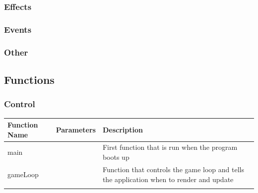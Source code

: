 \documentclass[../Main.tex]{subfiles}
\begin{document}
        \subsubsection{Effects}
            
        \clearpage
        \subsubsection{Events}
            
        \clearpage
        \subsubsection{Other}
            
        \clearpage
    \subsection{Functions}
        \subsubsection{Control}
        \begin{center}
            \begin{tabular}{ | m{} | m{}| m{} | }
                \hline
                \textbf{Function Name} & \textbf{Parameters} & \textbf{Description} \\
                \hline
                main & & First function that is run when the program boots up \\
                \hline
                gameLoop & & Function that controls the game loop and tells the application when to render and update \\
                \hline
                & & \\
                \hline
            \end{tabular}
        \end{center}
\end{document}

